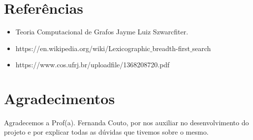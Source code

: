 \documentclass[a4paper, 11pt]{article}
\begin{document}
		\section{Referências}	
			\begin{itemize}
				\item Teoria Computacional de Grafos
				Jayme Luiz Szwarcfiter.
				
				\item https://en.wikipedia.org/wiki/Lexicographic$\_$breadth-first$\_$search
				
				\item https://www.cos.ufrj.br/uploadfile/1368208720.pdf
				
			\end{itemize}
		\section{Agradecimentos}
			\paragraph{} Agradecemos a Prof(a). Fernanda Couto, por nos auxiliar no desenvolvimento do projeto e por explicar todas as dúvidas que tivemos sobre o mesmo.
\end{document}
